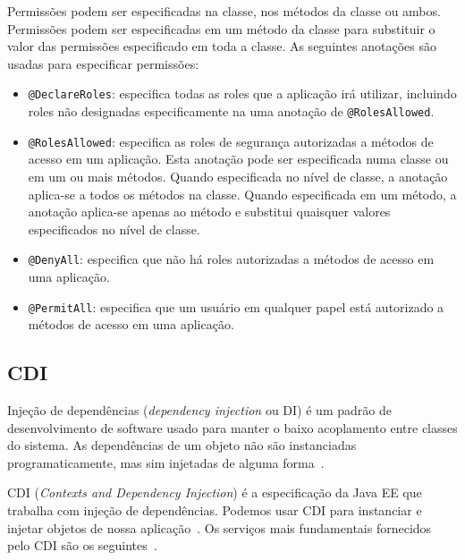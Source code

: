 Permissões podem ser especificadas na classe, nos métodos da classe ou ambos. Permissões podem ser especificadas em um método da classe para substituir o valor das permissões especificado em toda a classe. As seguintes anotações são usadas para especificar permissões:

\begin{itemize}
	\item \texttt{@DeclareRoles}: especifica todas as roles que a aplicação irá utilizar, incluindo roles não designadas especificamente na uma anotação de \texttt{@RolesAllowed}.
	
	\item \texttt{@RolesAllowed}: especifica as roles de segurança autorizadas a métodos de acesso em um aplicação. Esta anotação pode ser especificada numa classe ou em um ou mais métodos. Quando especificada no nível de classe, a anotação aplica-se a todos os métodos na classe. Quando especificada em um método, a anotação aplica-se apenas ao método e substitui quaisquer valores especificados no nível de classe.
	
	\item \texttt{@DenyAll}: especifica que não há roles autorizadas a métodos de acesso em uma aplicação.
	
	\item \texttt{@PermitAll}: especifica que um usuário em qualquer papel está autorizado  a métodos de acesso em uma aplicação.
	
\end{itemize}





\subsection{CDI}

Injeção de dependências (\textit{dependency injection} ou DI) é um padrão de desenvolvimento de software usado para manter o baixo acoplamento entre classes do sistema. As dependências de um objeto não são instanciadas programaticamente, mas sim injetadas de alguma forma~\cite{thiagoJava}.

CDI (\textit{Contexts and Dependency Injection}) é a especificação da Java EE que trabalha com injeção de dependências. Podemos usar CDI para instanciar e injetar objetos de nossa aplicação~\cite{thiagoJava}. Os serviços mais fundamentais fornecidos pelo CDI são os seguintes~\cite{oracleJAAS}.


